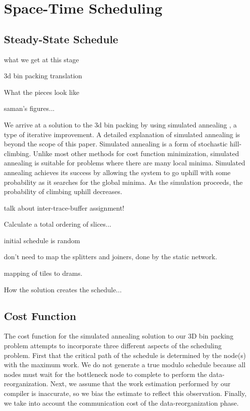 \section{Space-Time Scheduling}
\label{sec:scheduling}
\subsection{Steady-State Schedule}


what we get at this stage

3d bin packing translation

What the pieces look like 

saman's figures...

We arrive at a solution to the 3d bin packing by using simulated
annealing \cite{simanneal}, a type of iterative improvement.  A
detailed explanation of simulated annealing is beyond the scope of
this paper.  Simulated annealing is a form of stochastic
hill-climbing. Unlike most other methods for cost function
minimization, simulated annealing is suitable for problems where there
are many local minima.  Simulated annealing achieves its success by
allowing the system to go uphill with some probability as it searches
for the global minima.  As the simulation proceeds, the probability of
climbing uphill decreases.

talk about inter-trace-buffer assignment!

Calculate a total ordering of slices...

initial schedule is random

don't need to map the splitters and joiners, done by the static network.

mapping of tiles to drams.

How the solution creates the schedule...

\subsection{Cost Function}
The cost function for the simulated annealing solution to our 3D bin
packing problem attempts to incorporate three different aspects of the
scheduling problem.  First that the critical path of the schedule is
determined by the node(s) with the maximum work.  We do not generate a
true modulo schedule because all nodes must wait for the bottleneck
node to complete to perform the data-reorganization.  Next, we assume
that the work estimation performed by our compiler is inaccurate, so
we bias the estimate to reflect this observation.  Finally, we take
into account the communication cost of the data-reorganization phase.

